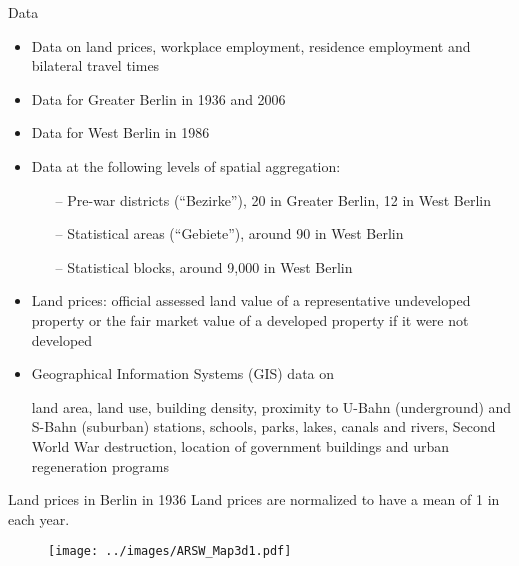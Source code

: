 \documentclass[10pt,notes=hide]{beamer}
\begin{document}
%
%
%
\begin{frame}{Data}
\begin{itemize}
\item Data on land prices, workplace employment, residence employment and bilateral travel times
\item Data for Greater Berlin in 1936 and 2006
\item Data for West Berlin in 1986
\item Data at the following levels of spatial aggregation:
    \begin{itemize}
    \item[--] Pre-war districts (``Bezirke''), 20 in Greater Berlin, 12 in West Berlin
    \item[--] Statistical areas (``Gebiete''), around 90 in West Berlin
    \item[--] Statistical blocks, around 9,000 in West Berlin
    \end{itemize}
\item Land prices: official assessed land value of a representative undeveloped property or the fair market value of a developed property if it were not developed
\item Geographical Information Systems (GIS) data on\\
{\small land area, land use, building density, proximity to U-Bahn (underground) and S-Bahn (suburban) stations, schools, parks, lakes, canals and rivers, Second World War destruction, location of government buildings and urban regeneration programs\par}
\end{itemize}
\end{frame}
\begin{frame}{Land prices in Berlin in 1936}
Land prices are normalized to have a mean of 1 in each year.
\begin{figure}
\centering
  \texttt{[image: ../images/ARSW\_Map3d1.pdf]}
\end{figure}
\end{frame}
\end{document}

